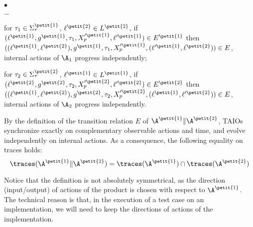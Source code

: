 \documentclass{LMCS}
\theoremstyle{plain}\newtheorem{proposition}[thm]{Proposition}
\begin{document}
\begin{defi}
\begin{iteMize}{$\bullet$}
\begin{iteMize}{$-$}
\item for $\tau_1 \in \Sigma_\tau^{\petit{1}}$, $\ell^{\petit{2}} \in L^{\petit{2}}$,
if $(\ell^{\petit{1}},g^{\petit{1}},\tau_1,X'^{\petit{1}}_p,\ell'^{\petit{1}}) \in E^{\petit{1}}$
then 
$((\ell^{\petit{1}},\ell^{\petit{2}}),g^{\petit{1}},\tau_1,
X'^{\petit{1}}_p,(\ell'^{\petit{1}},\ell^{\petit{2}})) \in E$, 
\ie internal actions of $\A_1$ progress independently;
\item for $\tau_2 \in \Sigma_\tau^{\petit{2}}$, $\ell^{\petit{1}} \in L^{\petit{1}}$,
if $(\ell^{\petit{2}},g^{\petit{2}},\tau_2,X'^{\petit{2}}_p,\ell'^{\petit{2}}) \in E^{\petit{2}}$
then 
$((\ell^{\petit{1}},\ell^{\petit{2}}),g^{\petit{2}},\tau_2,
X'^{\petit{2}}_p,(\ell^{\petit{1}},\ell'^{\petit{2}})) \in E$, 
\ie internal actions of $\A_2$ progress independently.
\end{iteMize}
\end{iteMize}
\end{defi}\medskip

\noindent By the definition of the transition relation $E$ of $\A^{\petit{1}} \| \A^{\petit{2}}$,
TAIOs synchronize exactly on complementary observable actions and time, 
and evolve independently on internal actions. 
As a consequence, the following equality on traces holds:
\begin{equation}
\label{eq-traces}
\traces(\A^{\petit{1}} \| \A^{\petit{2}}) =
  \traces(\A^{\petit{1}})
  \cap
  \traces(\A^{\petit{2}}) 
\end{equation}





Notice that the definition is not absolutely symmetrical, 
as the  direction (input/output) of actions of the product is chosen 
with respect to $\A^{\petit{1}}$.
The technical reason is that, 
in the execution of a test case on an implementation,
we will need to keep the directions of actions of the implementation. 
\end{document}

